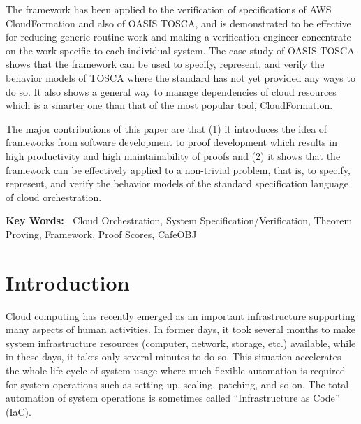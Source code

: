 \documentclass[12pt]{report}
\begin{document}
The framework has been applied to the verification of specifications
of AWS CloudFormation and also of OASIS TOSCA, and is demonstrated to
be effective for reducing generic routine work and making a
verification engineer concentrate on the work specific to each
individual system. The case study of OASIS TOSCA shows that the framework
can be used to specify, represent, and verify the behavior models of
TOSCA where the standard has not yet provided any ways to do so. It
also shows a general way to manage dependencies of cloud resources
which is a smarter one than that of the most popular tool,
CloudFormation.

The major contributions of this paper are that (1) it introduces the
idea of frameworks from software development to proof development
which results in high productivity and high maintainability of proofs
and (2) it shows that the framework can be effectively applied to a
non-trivial problem, that is, to specify, represent, and verify the
behavior models of the standard specification language of cloud
orchestration.


\vspace{0.3cm} {\bf Key Words:\ } Cloud Orchestration, System
Specification/Verification, Theorem Proving, Framework, Proof Scores,
CafeOBJ



\tableofcontents
\listoffigures
\listoftables
\newpage
{}
\setcounter{page}{1}

\chapter{Introduction}
Cloud computing has recently emerged as an important infrastructure
supporting many aspects of human activities. In former days, it took
several months to make system infrastructure resources (computer,
network, storage, etc.) available, while in these days, it takes only
several minutes to do so. This situation accelerates the whole life
cycle of system usage where much flexible automation is required for
system operations such as setting up, scaling, patching, and so on.
The total automation of system operations is sometimes called
``Infrastructure as Code'' (IaC).

\end{document}
